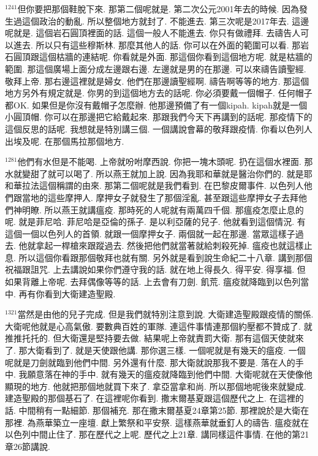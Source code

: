 \documentclass{book}
\begin{document}
$^{1241}$但你要把那個鞋脫下來.
那第二個呢就是.
第二次公元2001年去的時候.
因為發生過這個政治的動亂.
所以整個地方就封了.
不能進去.
第三次呢是2017年去.
這邊呢就是.
這個岩石圓頂裡面的話.
這個一般人不能進去.
你只有做禮拜.
去禱告人可以進去.
所以只有這些穆斯林.
那麼其他人的話.
你可以在外面的範圍可以看.
那岩石圓頂跟這個枯牆的連結呢.
你看就是外面.
那這個你看到這個地方呢.
就是枯牆的範圍.
那這個廣場上面分成左邊跟右邊.
左邊就是男的在那邊.
可以來禱告讀聖經.
敬拜上帝.
那右邊這裡就是婦女.
他們在那邊讀聖經啊.
禱告啊等等的地方.
那這個地方另外有規定就是.
你男的到這個地方去的話呢.
你必須要戴一個帽子.
任何帽子都OK.
如果但是你沒有戴帽子怎麼辦.
他那邊預備了有一個kipah.
kipah就是一個小圓頂帽.
你可以在那邊把它給戴起來.
那跟我們今天下再講到的話呢.
那疫情下的這個反思的話呢.
我想就是特別講三個.
一個講說會幕的敬拜跟疫情.
你看以色列人出埃及呢.
在那個馬拉那個地方.

$^{1281}$他們有水但是不能喝.
上帝就吩咐摩西說.
你把一塊木頭呢.
扔在這個水裡面.
那水就變甜了就可以喝了.
所以燕王就加上說.
因為我耶和華就是醫治你們的.
就是耶和華拉法這個稱謂的由來.
那第二個呢就是我們看到.
在巴黎皮爾事件.
以色列人他們跟當地的這些摩押人.
摩押女子就發生了那個淫亂.
甚至跟這些摩押女子去拜他們神明瞭.
所以燕王就講瘟疫.
那時死的人呢就有兩萬四千個.
那瘟疫怎麼止息的呢.
就是菲尼哈.
菲尼哈是亞倫的孫子.
是以利亞薩的兒子.
他就看到這個情況.
有這個一個以色列人的首領.
就跟一個摩押女子.
兩個就一起在那邊.
當眾這樣子過去.
他就拿起一桿槍來跟蹤過去.
然後把他們就當著就給刺殺死掉.
瘟疫也就這樣止息.
所以這個你看跟那個敬拜也就有關.
另外就是看到說生命紀二十八章.
講到那個祝福跟詛咒.
上去講說如果你們遵守我的話.
就在地上得長久.
得平安.
得享福.
但如果背離上帝呢.
去拜偶像等等的話.
上去會有刀劍.
飢荒.
瘟疫就降臨到以色列當中.
再有你看到大衛建造聖殿.

$^{1321}$當然是由他的兒子完成.
但是我們就特別注意到說.
大衛建造聖殿跟疫情的關係.
大衛呢他就是心高氣傲.
要數典百姓的軍隊.
連這件事情連那個約壓都不贊成了.
就推推托托的.
但大衛還是堅持要去做.
結果呢上帝就責罰大衛.
那有這個天使就來了.
那大衛看到了.
就是天使跟他講.
那你選三樣.
一個呢就是有幾天的瘟疫.
一個呢就是刀劍就臨到他們中間.
另外還有什麼.
那大衛就說那我不要是.
落在人的手中.
我願意落在神的手中.
就有幾天的瘟疫就降臨到他們中間.
大衛呢就在天使像他顯現的地方.
他就把那個地就買下來了.
拿亞當拿和尚.
所以那個地呢後來就變成.
建造聖殿的那個基石了.
在這裡呢你看到.
撒末爾基夏跟這個歷代之上.
在這裡的話.
中間稍有一點細節.
那個補充.
那在撒末爾基夏24章第25節.
那裡說於是大衛在那裡.
為燕華築立一座壇.
獻上繁祭和平安祭.
這樣燕華就垂釘人的禱告.
瘟疫就在以色列中間止住了.
那在歷代之上呢.
歷代之上21章.
講同樣這件事情.
在他的第21章26節講說.
\end{document}
